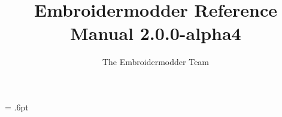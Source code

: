 \hfuzz = .6pt %

\usepackage{courier}
\usepackage{tgbonum}

\usepackage{geometry}
\usepackage{multicol}
\usepackage{amsmath}
\usepackage{amssymb}
\usepackage{listings}
\usepackage{hyperref}
\usepackage{natbib}
\usepackage{fancyhdr}
\usepackage{imakeidx}
\usepackage{graphicx}
\usepackage{color}
\usepackage{xcolor}
\usepackage{longtable}
\usepackage{booktabs}


\geometry{
    margin=1.4in,
    marginparwidth=0.8in
}

\newcommand{\embversion}{2.0.0-alpha4}
\newcommand{\version}{\embversion}
\newcommand{\libembversion}{1.0.0-alpha}
\newcommand{\publicationdate}{August 2023}

\newcommand{\todo}[1]{\marginpar{\emph{TODO}\\{\footnotesize #1}}}

\makeindex

\title{Embroidermodder Reference Manual \embversion}
\author{The Embroidermodder Team}

\lstset{
  basicstyle=\ttfamily\footnotesize,
  language=C,
  numbers=left,
  extendedchars=true,
  title=\lstname,
  frame=single
}

\hypersetup{
  colorlinks=true,
  breaklinks=true,
  linkcolor=black,
  filecolor=black,      
  urlcolor=black,
  citecolor=black
}



